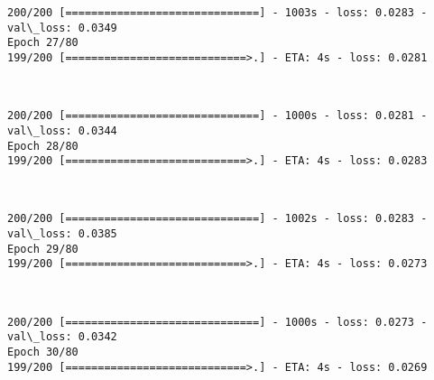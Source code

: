 \documentclass[11pt]{article}
\begin{document}
    \begin{Verbatim}[commandchars=\\\{\}]
200/200 [==============================] - 1003s - loss: 0.0283 - val\_loss: 0.0349
Epoch 27/80
199/200 [============================>.] - ETA: 4s - loss: 0.0281
    \end{Verbatim}

    \begin{center}
    \end{center}
    { \hspace*{\fill} \\}
    
    \begin{Verbatim}[commandchars=\\\{\}]
200/200 [==============================] - 1000s - loss: 0.0281 - val\_loss: 0.0344
Epoch 28/80
199/200 [============================>.] - ETA: 4s - loss: 0.0283
    \end{Verbatim}

    \begin{center}
    \end{center}
    { \hspace*{\fill} \\}
    
    \begin{Verbatim}[commandchars=\\\{\}]
200/200 [==============================] - 1002s - loss: 0.0283 - val\_loss: 0.0385
Epoch 29/80
199/200 [============================>.] - ETA: 4s - loss: 0.0273
    \end{Verbatim}

    \begin{center}
    \end{center}
    { \hspace*{\fill} \\}
    
    \begin{Verbatim}[commandchars=\\\{\}]
200/200 [==============================] - 1000s - loss: 0.0273 - val\_loss: 0.0342
Epoch 30/80
199/200 [============================>.] - ETA: 4s - loss: 0.0269
    \end{Verbatim}

    \begin{center}
    \end{center}
    { \hspace*{\fill} \\}
    
\end{document}
